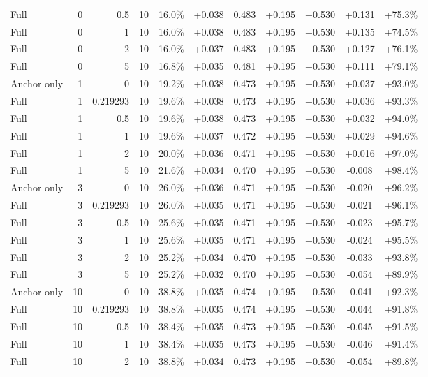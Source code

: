 \begin{table}[htbp]
\begin{tabular}{lrrrccccccc}
Full & 0 & 0.5 & 10 & 16.0\% & +0.038 & 0.483 & +0.195 & +0.530 & +0.131 & +75.3\% \\
Full & 0 & 1 & 10 & 16.0\% & +0.038 & 0.483 & +0.195 & +0.530 & +0.135 & +74.5\% \\
Full & 0 & 2 & 10 & 16.0\% & +0.037 & 0.483 & +0.195 & +0.530 & +0.127 & +76.1\% \\
Full & 0 & 5 & 10 & 16.8\% & +0.035 & 0.481 & +0.195 & +0.530 & +0.111 & +79.1\% \\
Anchor only & 1 & 0 & 10 & 19.2\% & +0.038 & 0.473 & +0.195 & +0.530 & +0.037 & +93.0\% \\
Full & 1 & 0.219293 & 10 & 19.6\% & +0.038 & 0.473 & +0.195 & +0.530 & +0.036 & +93.3\% \\
Full & 1 & 0.5 & 10 & 19.6\% & +0.038 & 0.473 & +0.195 & +0.530 & +0.032 & +94.0\% \\
Full & 1 & 1 & 10 & 19.6\% & +0.037 & 0.472 & +0.195 & +0.530 & +0.029 & +94.6\% \\
Full & 1 & 2 & 10 & 20.0\% & +0.036 & 0.471 & +0.195 & +0.530 & +0.016 & +97.0\% \\
Full & 1 & 5 & 10 & 21.6\% & +0.034 & 0.470 & +0.195 & +0.530 & -0.008 & +98.4\% \\
Anchor only & 3 & 0 & 10 & 26.0\% & +0.036 & 0.471 & +0.195 & +0.530 & -0.020 & +96.2\% \\
Full & 3 & 0.219293 & 10 & 26.0\% & +0.035 & 0.471 & +0.195 & +0.530 & -0.021 & +96.1\% \\
Full & 3 & 0.5 & 10 & 25.6\% & +0.035 & 0.471 & +0.195 & +0.530 & -0.023 & +95.7\% \\
Full & 3 & 1 & 10 & 25.6\% & +0.035 & 0.471 & +0.195 & +0.530 & -0.024 & +95.5\% \\
Full & 3 & 2 & 10 & 25.2\% & +0.034 & 0.470 & +0.195 & +0.530 & -0.033 & +93.8\% \\
Full & 3 & 5 & 10 & 25.2\% & +0.032 & 0.470 & +0.195 & +0.530 & -0.054 & +89.9\% \\
Anchor only & 10 & 0 & 10 & 38.8\% & +0.035 & 0.474 & +0.195 & +0.530 & -0.041 & +92.3\% \\
Full & 10 & 0.219293 & 10 & 38.8\% & +0.035 & 0.474 & +0.195 & +0.530 & -0.044 & +91.8\% \\
Full & 10 & 0.5 & 10 & 38.4\% & +0.035 & 0.473 & +0.195 & +0.530 & -0.045 & +91.5\% \\
Full & 10 & 1 & 10 & 38.4\% & +0.035 & 0.473 & +0.195 & +0.530 & -0.046 & +91.4\% \\
Full & 10 & 2 & 10 & 38.8\% & +0.034 & 0.473 & +0.195 & +0.530 & -0.054 & +89.8\% \\

\end{tabular}
\end{table}
